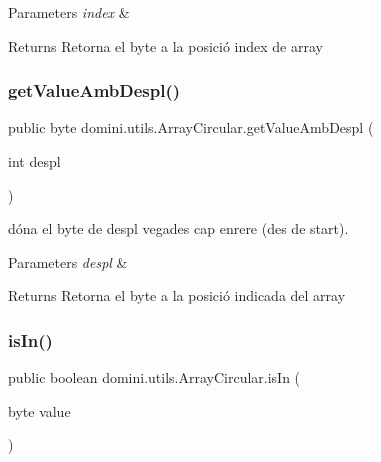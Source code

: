 \begin{DoxyParams}{Parameters}
{\em index} & \\
\hline
\end{DoxyParams}
\begin{DoxyReturn}{Returns}
Retorna el byte a la posició index de array 
\end{DoxyReturn}
\mbox{\label{classdomini_1_1utils_1_1ArrayCircular_aa36c40061ff0f3ea0ae15f5b06900e94}} 
\subsubsection{\texorpdfstring{get\+Value\+Amb\+Despl()}{getValueAmbDespl()}}
{\footnotesize\ttfamily public byte domini.\+utils.\+Array\+Circular.\+get\+Value\+Amb\+Despl (\begin{DoxyParamCaption}\item[{int}]{despl }\end{DoxyParamCaption})\hspace{0.3cm}{\ttfamily [inline]}}



dóna el byte de despl vegades cap enrere (des de start). 


\begin{DoxyParams}{Parameters}
{\em despl} & \\
\hline
\end{DoxyParams}
\begin{DoxyReturn}{Returns}
Retorna el byte a la posició indicada del array 
\end{DoxyReturn}
\mbox{\label{classdomini_1_1utils_1_1ArrayCircular_aaf106d070b5937f2559a56257dc8cac3}} 
\subsubsection{\texorpdfstring{is\+In()}{isIn()}}
{\footnotesize\ttfamily public boolean domini.\+utils.\+Array\+Circular.\+is\+In (\begin{DoxyParamCaption}\item[{byte}]{value }\end{DoxyParamCaption})\hspace{0.3cm}{\ttfamily [inline]}}



